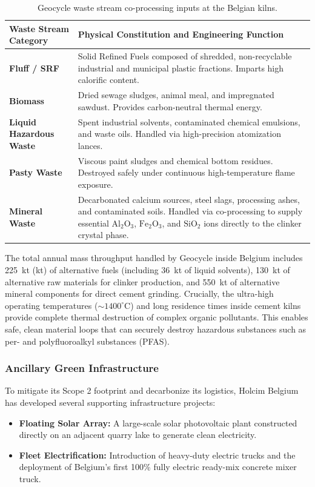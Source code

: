 \begin{table}[!ht]
\centering
\small
\begin{tabular}{lp{11cm}}
\toprule
\textbf{Waste Stream Category} & \textbf{Physical Constitution and Engineering Function} \\
\midrule
\textbf{Fluff / SRF} & Solid Refined Fuels composed of shredded, non-recyclable industrial and municipal plastic fractions. Imparts high calorific content. \\
\textbf{Biomass} & Dried sewage sludges, animal meal, and impregnated sawdust. Provides carbon-neutral thermal energy. \\
\textbf{Liquid Hazardous Waste} & Spent industrial solvents, contaminated chemical emulsions, and waste oils. Handled via high-precision atomization lances. \\
\textbf{Pasty Waste} & Viscous paint sludges and chemical bottom residues. Destroyed safely under continuous high-temperature flame exposure. \\
\textbf{Mineral Waste} & Decarbonated calcium sources, steel slags, processing ashes, and contaminated soils. Handled via co-processing to supply essential $\text{Al}_2\text{O}_3$, $\text{Fe}_2\text{O}_3$, and $\text{SiO}_2$ ions directly to the clinker crystal phase. \\
\bottomrule
\end{tabular}
\caption{Geocycle waste stream co-processing inputs at the Belgian kilns.}
\label{tab:geocycle}
\end{table}

The total annual mass throughput handled by Geocycle inside Belgium includes \num{225}~\si{\kilo\tonne} (kt) of alternative fuels (including \num{36}~kt of liquid solvents), \num{130}~kt of alternative raw materials for clinker production, and \num{550}~kt of alternative mineral components for direct cement grinding. Crucially, the ultra-high operating temperatures ($\sim1400^\circ\text{C}$) and long residence times inside cement kilns provide complete thermal destruction of complex organic pollutants. This enables safe, clean material loops that can securely destroy hazardous substances such as per- and polyfluoroalkyl substances (PFAS).

\subsubsection{Ancillary Green Infrastructure}
To mitigate its Scope 2 footprint and decarbonize its logistics, Holcim Belgium has developed several supporting infrastructure projects:
\begin{itemize}
    \item \textbf{Floating Solar Array:} A large-scale solar photovoltaic plant constructed directly on an adjacent quarry lake to generate clean electricity.
    \item \textbf{Fleet Electrification:} Introduction of heavy-duty electric trucks and the deployment of Belgium’s first 100\% fully electric ready-mix concrete mixer truck.
\end{itemize}

